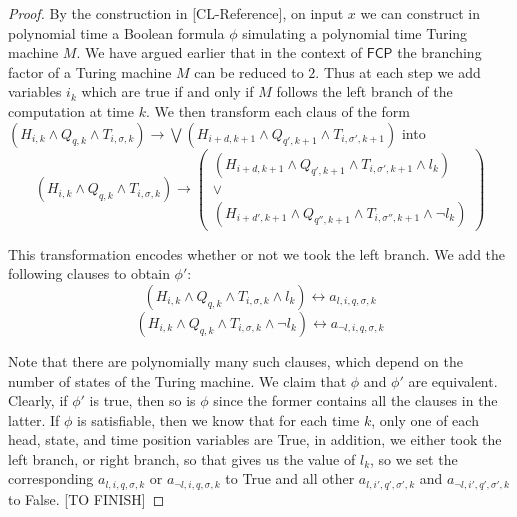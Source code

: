 \documentclass[runningheads,a4paper]{llncs}
\begin{document}
\begin{proof}

By the construction in [CL-Reference], on input $x$ we can construct in polynomial time a Boolean formula $\phi$ simulating a polynomial time Turing machine $M$. We have argued earlier that in the context of $\mathsf{FCP}$ the branching factor of a Turing machine $M$ can be reduced to $2$. Thus at each step we add variables $i_k$ which are true if and only if $M$ follows the left branch of the computation at time $k$. We then transform each claus of the form $(H_{i,k} \wedge Q_{q,k} \wedge T_{i, \sigma, k}) \rightarrow \bigvee (H_{i+d,k+1} \wedge Q_{q',k+1} \wedge T_{i,\sigma',k+1})$ into 
\[
 (H_{i,k} \wedge Q_{q,k} \wedge T_{i,\sigma, k}) \rightarrow \left(\begin{array}{c} (H_{i+d,k+1} \wedge Q_{q', k+1} \wedge T_{i,\sigma', k+1} \wedge l_k) \\ \vee \\ (H_{i+d',k+1} \wedge Q_{q'', k+1} \wedge T_{i,\sigma'', k+1} \wedge \neg l_k) \end{array}\right) 
 \]

This transformation encodes whether or not we took the left branch. We add the following clauses to obtain $\phi'$:
\[ (H_{i,k} \wedge Q_{q,k} \wedge T_{i,\sigma,k} \wedge l_k) \leftrightarrow a_{l, i, q, \sigma, k} \]
\[ (H_{i,k} \wedge Q_{q,k} \wedge T_{i,\sigma,k} \wedge \neg l_k) \leftrightarrow a_{\neg l, i, q, \sigma, k} \]

Note that there are polynomially many such clauses, which depend on the number of states of the Turing machine. We claim that $\phi$ and $\phi'$ are equivalent. Clearly, if $\phi'$ is true, then so is $\phi$ since the former contains all the clauses in the latter. If $\phi$ is satisfiable, then we know that for each time $k$, only one of each head, state, and time position variables are True, in addition, we either took the left branch, or right branch, so that gives us the value of $l_k$, so we set the corresponding $a_{l, i,q,\sigma,k}$ or $a_{\neg l, i, q, \sigma, k}$ to True and all other $a_{l, i', q', \sigma', k}$ and $a_{\neg l, i', q', \sigma', k}$ to False.
[TO FINISH]
\end{proof} 
\end{document}

